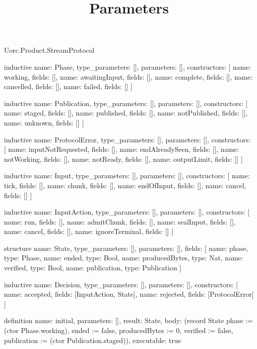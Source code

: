 \begin{lexlean}{Uorc.Product.StreamProtocol}
\title{Parameters}
\begin{semanticmodule}
inductive{
  name: Phase,
  type_parameters: [],
  parameters: [],
  constructors: [
    {name: working, fields: []},
    {name: awaitingInput, fields: []},
    {name: complete, fields: []},
    {name: cancelled, fields: []},
    {name: failed, fields: []}
  ]
}

inductive{
  name: Publication,
  type_parameters: [],
  parameters: [],
  constructors: [
    {name: staged, fields: []},
    {name: published, fields: []},
    {name: notPublished, fields: []},
    {name: unknown, fields: []}
  ]
}

inductive{
  name: ProtocolError,
  type_parameters: [],
  parameters: [],
  constructors: [
    {name: inputNotRequested, fields: []},
    {name: endAlreadySeen, fields: []},
    {name: notWorking, fields: []},
    {name: notReady, fields: []},
    {name: outputLimit, fields: []}
  ]
}

inductive{
  name: Input,
  type_parameters: [],
  parameters: [],
  constructors: [
    {name: tick, fields: []},
    {name: chunk, fields: []},
    {name: endOfInput, fields: []},
    {name: cancel, fields: []}
  ]
}

inductive{
  name: InputAction,
  type_parameters: [],
  parameters: [],
  constructors: [
    {name: run, fields: []},
    {name: admitChunk, fields: []},
    {name: sealInput, fields: []},
    {name: cancel, fields: []},
    {name: ignoreTerminal, fields: []}
  ]
}

structure{
  name: State,
  type_parameters: [],
  parameters: [],
  fields: [
    {name: phase, type: Phase},
    {name: ended, type: Bool},
    {name: producedBytes, type: Nat},
    {name: verified, type: Bool},
    {name: publication, type: Publication}
  ]
}

inductive{
  name: Decision,
  type_parameters: [],
  parameters: [],
  constructors: [
    {name: accepted, fields: [InputAction, State]},
    {name: rejected, fields: [ProtocolError]}
  ]
}

definition{
  name: initial,
  parameters: [],
  result: State,
  body: (record State {phase := (ctor Phase.working), ended := false, producedBytes := 0, verified := false, publication := (ctor Publication.staged)}),
  executable: true
}


\end{semanticmodule}
\end{lexlean}
